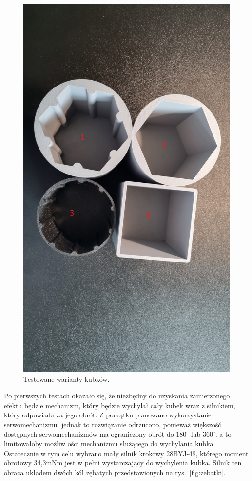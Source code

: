 \begin{figure}[H]
    \centering
    \includegraphics[width=0.65\linewidth, trim={35mm 380mm 20mm 240mm}, clip]{chapters/03-praca-wlasna/figures/kubki}
    \caption{\label{fig:kubki}Testowane warianty kubków.}
\end{figure}

Po pierwszych testach okazało się, że niezbędny do uzyskania zamierzonego efektu będzie mechanizm, który będzie 
wychylał cały kubek wraz z silnikiem, który odpowiada za jego obrót. Z początku planowano wykorzystanie
serwomechanizmu, jednak to rozwiązanie odrzucono, ponieważ większość dostępnych serwomechanizmów ma
ograniczony obrót do $180^{\circ}$ lub $360^{\circ}$, a to limitowałoby możliw ości mechanizmu służącego do wychylania kubka.
Ostatecznie w tym celu wybrano mały silnik krokowy 28BYJ-48, którego moment obrotowy 34,3mNm jest w pełni wystarczający do wychylenia kubka. 
Silnik ten obraca układem dwóch kół zębatych przedstawionych na rys.~\ref{fig:zebatki}.

